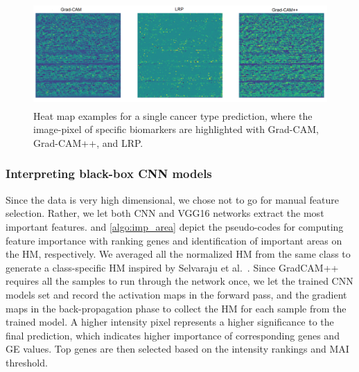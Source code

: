\begin{figure}[h]
		\centering
		\includegraphics[width=\linewidth,height=40mm]{images/3_mode.png}
	\caption{Heat map examples for a single cancer type prediction, where the image-pixel of specific biomarkers are highlighted with Grad-CAM, Grad-CAM++, and LRP.} 
	\label{fig:3hms}
\end{figure}

\subsubsection{Interpreting black-box CNN models}
Since the data is very high dimensional, we chose not to go for manual feature selection. Rather, we let both CNN and VGG16 networks extract the most important features.  and \ref{algo:imp_area} depict the pseudo-codes for computing feature importance with ranking genes and identification of important areas on the HM, respectively. We averaged all the normalized HM from the same class to generate a class-specific HM inspired by Selvaraju et al.~\cite{mostavi2019convolutional,karim2019onconetexplainer}. Since GradCAM++ requires all the samples to run through the network once, we let the trained CNN models set and record the activation maps in the forward pass, and the gradient maps in the back-propagation phase to collect the HM for each sample from the trained model. A higher intensity pixel represents a higher significance to the final prediction, which indicates higher importance of corresponding genes and GE values. Top genes are then selected based on the intensity rankings and MAI threshold. 

